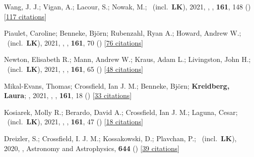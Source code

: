 \item[{\color{numcolor}\scriptsize51}] Wang, J. J.; Vigan, A.; Lacour, S.; Nowak, M.; \etal\ (incl.\ \textbf{LK}), 2021, , \aj, \textbf{161}, 148 () [\href{https://ui.adsabs.harvard.edu/abs/2021AJ....161..148W}{117 citations}]

\item[{\color{numcolor}\scriptsize50}] Piaulet, Caroline; Benneke, Bj{\"o}rn; Rubenzahl, Ryan A.; Howard, Andrew W.; \etal\ (incl.\ \textbf{LK}), 2021, , \aj, \textbf{161}, 70 () [\href{https://ui.adsabs.harvard.edu/abs/2021AJ....161...70P}{76 citations}]

\item[{\color{numcolor}\scriptsize49}] Newton, Elisabeth R.; Mann, Andrew W.; Kraus, Adam L.; Livingston, John H.; \etal\ (incl.\ \textbf{LK}), 2021, , \aj, \textbf{161}, 65 () [\href{https://ui.adsabs.harvard.edu/abs/2021AJ....161...65N}{48 citations}]

\item[{\color{numcolor}\scriptsize48}] Mikal-Evans, Thomas; Crossfield, Ian J. M.; Benneke, Bj{\"o}rn; \textbf{Kreidberg, Laura}; \etal, 2021, , \aj, \textbf{161}, 18 () [\href{https://ui.adsabs.harvard.edu/abs/2021AJ....161...18M}{33 citations}]

\item[{\color{numcolor}\scriptsize47}] Kosiarek, Molly R.; Berardo, David A.; Crossfield, Ian J. M.; Laguna, Cesar; \etal\ (incl.\ \textbf{LK}), 2021, , \aj, \textbf{161}, 47 () [\href{https://ui.adsabs.harvard.edu/abs/2021AJ....161...47K}{18 citations}]

\item[{\color{numcolor}\scriptsize46}] Dreizler, S.; Crossfield, I. J. M.; Kossakowski, D.; Plavchan, P.; \etal\ (incl.\ \textbf{LK}), 2020, , Astronomy and Astrophysics, \textbf{644} () [\href{https://ui.adsabs.harvard.edu/abs/2020A&A...644A.127D}{39 citations}]

